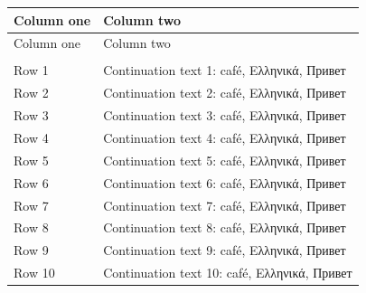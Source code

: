 \documentclass{article}
\begin{document}
\begin{longtable}{>{\raggedright\arraybackslash}p{}>{\raggedright\arraybackslash}p{}}
Column one\par  & Column two\par  \\
\endfirsthead
Column one\par  & Column two\par  \\
\endhead
\endfoot
\endlastfoot
\multicolumn{2}{>{\raggedright\arraybackslash}p{\dimexpr1.000000\linewidth-2\tabcolsep\relax}}{Merged heading\par } \\
Row 1\par  & Continuation text 1: café, Ελληνικά, Привет\par  \\
Row 2\par  & Continuation text 2: café, Ελληνικά, Привет\par  \\
Row 3\par  & Continuation text 3: café, Ελληνικά, Привет\par  \\
Row 4\par  & Continuation text 4: café, Ελληνικά, Привет\par  \\
Row 5\par  & Continuation text 5: café, Ελληνικά, Привет\par  \\
Row 6\par  & Continuation text 6: café, Ελληνικά, Привет\par  \\
Row 7\par  & Continuation text 7: café, Ελληνικά, Привет\par  \\
Row 8\par  & Continuation text 8: café, Ελληνικά, Привет\par  \\
Row 9\par  & Continuation text 9: café, Ελληνικά, Привет\par  \\
Row 10\par  & Continuation text 10: café, Ελληνικά, Привет\par  \\

\end{longtable}
\end{document}
